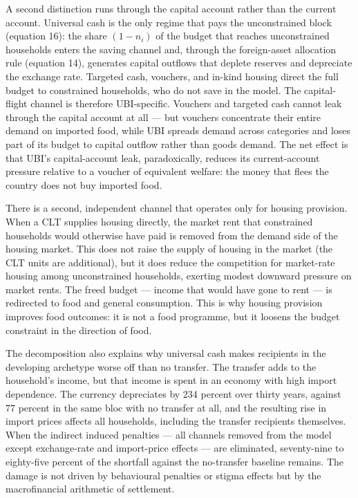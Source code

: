 \documentclass[preprint,review,12pt]{elsarticle}
\begin{document}
A second distinction runs through the capital account rather than the
current account. Universal cash is the only regime that pays the
unconstrained block (equation 16): the share \((1 - n_i)\) of the budget
that reaches unconstrained households enters the saving channel and,
through the foreign-asset allocation rule (equation 14), generates
capital outflows that deplete reserves and depreciate the exchange rate.
Targeted cash, vouchers, and in-kind housing direct the full budget to
constrained households, who do not save in the model. The capital-flight
channel is therefore UBI-specific. Vouchers and targeted cash cannot
leak through the capital account at all --- but vouchers concentrate
their entire demand on imported food, while UBI spreads demand across
categories and loses part of its budget to capital outflow rather than
goods demand. The net effect is that UBI's capital-account leak,
paradoxically, reduces its current-account pressure relative to a
voucher of equivalent welfare: the money that flees the country does not
buy imported food.

There is a second, independent channel that operates only for housing
provision. When a CLT supplies housing directly, the market rent that
constrained households would otherwise have paid is removed from the
demand side of the housing market. This does not raise the supply of
housing in the market (the CLT units are additional), but it does reduce
the competition for market-rate housing among unconstrained households,
exerting modest downward pressure on market rents. The freed budget ---
income that would have gone to rent --- is redirected to food and
general consumption. This is why housing provision improves food
outcomes: it is not a food programme, but it loosens the budget
constraint in the direction of food.

The decomposition also explains why universal cash makes recipients in
the developing archetype worse off than no transfer. The transfer adds
to the household's income, but that income is spent in an economy with
high import dependence. The currency depreciates by 234 percent over
thirty years, against 77 percent in the same bloc with no transfer at
all, and the resulting rise in import prices affects all households,
including the transfer recipients themselves. When the indirect induced
penalties --- all channels removed from the model except exchange-rate
and import-price effects --- are eliminated, seventy-nine to eighty-five
percent of the shortfall against the no-transfer baseline remains. The damage is not driven by
behavioural penalties or stigma effects but by the macrofinancial
arithmetic of settlement.
\end{document}

